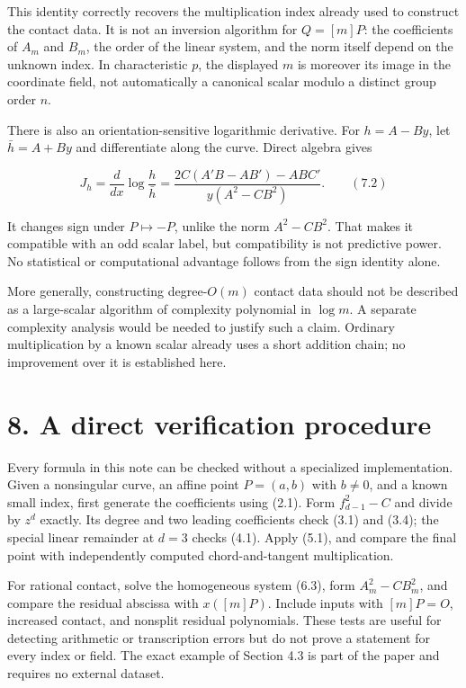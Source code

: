 \documentclass[
  11pt,
  a4paper,
]{article}
\begin{document}
This identity correctly recovers the multiplication index already used
to construct the contact data. It is not an inversion algorithm for
\(Q=[m]P\): the coefficients of \(A_m\) and \(B_m\), the order of the
linear system, and the norm itself depend on the unknown index. In
characteristic \(p\), the displayed \(m\) is moreover its image in the
coordinate field, not automatically a canonical scalar modulo a distinct
group order \(n\).

There is also an orientation-sensitive logarithmic derivative. For
\(h=A-By\), let \(\bar h=A+By\) and differentiate along the curve.
Direct algebra gives

\[
J_h=\frac{d}{dx}\log\frac{h}{\bar h}
=\frac{2C(A'B-AB')-AB C'}{y(A^2-CB^2)}. \qquad (7.2)
\]

It changes sign under \(P\mapsto-P\), unlike the norm \(A^2-CB^2\). That
makes it compatible with an odd scalar label, but compatibility is not
predictive power. No statistical or computational advantage follows from
the sign identity alone.

More generally, constructing degree-\(O(m)\) contact data should not be
described as a large-scalar algorithm of complexity polynomial in
\(\log m\). A separate complexity analysis would be needed to justify
such a claim. Ordinary multiplication by a known scalar already uses a
short addition chain; no improvement over it is established here.

\section{8. A direct verification
procedure}\label{a-direct-verification-procedure}

Every formula in this note can be checked without a specialized
implementation. Given a nonsingular curve, an affine point \(P=(a,b)\)
with \(b\neq0\), and a known small index, first generate the
coefficients using (2.1). Form \(f_{d-1}^2-C\) and divide by \(z^d\)
exactly. Its degree and two leading coefficients check (3.1) and (3.4);
the special linear remainder at \(d=3\) checks (4.1). Apply (5.1), and
compare the final point with independently computed chord-and-tangent
multiplication.

For rational contact, solve the homogeneous system (6.3), form
\(A_m^2-CB_m^2\), and compare the residual abscissa with \(x([m]P)\).
Include inputs with \([m]P=O\), increased contact, and nonsplit residual
polynomials. These tests are useful for detecting arithmetic or
transcription errors but do not prove a statement for every index or
field. The exact example of Section 4.3 is part of the paper and
requires no external dataset.
\end{document}
